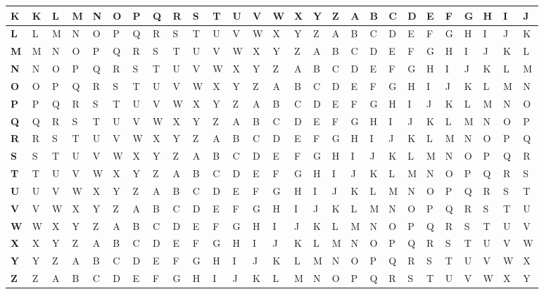 \begin{table}[]
{\begin{tabular}{l|l|l|l|l|l|l|l|l|l|l|l|l|l|l|l|l|l|l|l|l|l|l|l|l|l|l|}
\multicolumn{1}{|l|}{\textbf{K}} & K & L & M & N & O & P & Q & R & S & T & U & V & W & X & Y & Z & A & B & C & D & E & F & G & H & I & J \\ \hline
\multicolumn{1}{|l|}{\textbf{L}} & L & M & N & O & P & Q & R & S & T & U & V & W & X & Y & Z & A & B & C & D & E & F & G & H & I & J & K \\ \hline
\multicolumn{1}{|l|}{\textbf{M}} & M & N & O & P & Q & R & S & T & U & V & W & X & Y & Z & A & B & C & D & E & F & G & H & I & J & K & L \\ \hline
\multicolumn{1}{|l|}{\textbf{N}} & N & O & P & Q & R & S & T & U & V & W & X & Y & Z & A & B & C & D & E & F & G & H & I & J & K & L & M \\ \hline
\multicolumn{1}{|l|}{\textbf{O}} & O & P & Q & R & S & T & U & V & W & X & Y & Z & A & B & C & D & E & F & G & H & I & J & K & L & M & N \\ \hline
\multicolumn{1}{|l|}{\textbf{P}} & P & Q & R & S & T & U & V & W & X & Y & Z & A & B & C & D & E & F & G & H & I & J & K & L & M & N & O \\ \hline
\multicolumn{1}{|l|}{\textbf{Q}} & Q & R & S & T & U & V & W & X & Y & Z & A & B & C & D & E & F & G & H & I & J & K & L & M & N & O & P \\ \hline
\multicolumn{1}{|l|}{\textbf{R}} & R & S & T & U & V & W & X & Y & Z & A & B & C & D & E & F & G & H & I & J & K & L & M & N & O & P & Q \\ \hline
\multicolumn{1}{|l|}{\textbf{S}} & S & T & U & V & W & X & Y & Z & A & B & C & D & E & F & G & H & I & J & K & L & M & N & O & P & Q & R \\ \hline
\multicolumn{1}{|l|}{\textbf{T}} & T & U & V & W & X & Y & Z & A & B & C & D & E & F & G & H & I & J & K & L & M & N & O & P & Q & R & S \\ \hline
\multicolumn{1}{|l|}{\textbf{U}} & U & V & W & X & Y & Z & A & B & C & D & E & F & G & H & I & J & K & L & M & N & O & P & Q & R & S & T \\ \hline
\multicolumn{1}{|l|}{\textbf{V}} & V & W & X & Y & Z & A & B & C & D & E & F & G & H & I & J & K & L & M & N & O & P & Q & R & S & T & U \\ \hline
\multicolumn{1}{|l|}{\textbf{W}} & W & X & Y & Z & A & B & C & D & E & F & G & H & I & J & K & L & M & N & O & P & Q & R & S & T & U & V \\ \hline
\multicolumn{1}{|l|}{\textbf{X}} & X & Y & Z & A & B & C & D & E & F & G & H & I & J & K & L & M & N & O & P & Q & R & S & T & U & V & W \\ \hline
\multicolumn{1}{|l|}{\textbf{Y}} & Y & Z & A & B & C & D & E & F & G & H & I & J & K & L & M & N & O & P & Q & R & S & T & U & V & W & X \\ \hline
\multicolumn{1}{|l|}{\textbf{Z}} & Z & A & B & C & D & E & F & G & H & I & J & K & L & M & N & O & P & Q & R & S & T & U & V & W & X & Y \\ \hline
\end{tabular}%
}
\end{table}

